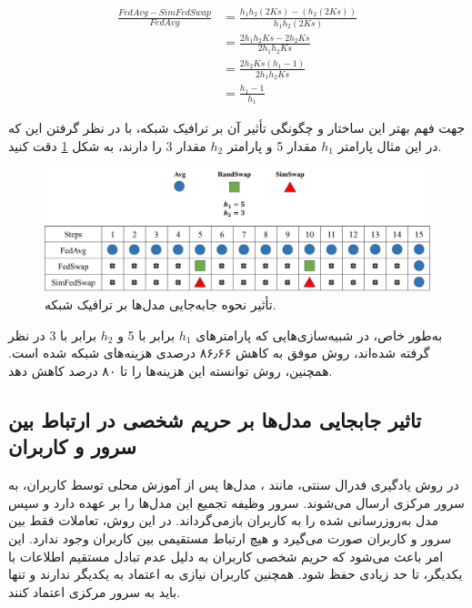 \begingroup
\addtolength{\jot}{0.5em}
\begin{equation}
	\begin{aligned} 
		\frac{FedAvg-SimFedSwap}{FedAvg}
		&= \frac{h_1h_2(2Ks)-(h_2(2Ks))}{h_1h_2(2Ks)} \\
		&= \frac{2h_1h_2Ks-2h_2Ks}{2h_1h_2Ks} \\
		&= \frac{2h_2Ks(h_1 -1)}{2h_1h_2Ks} \\
		&= \frac{h_1 -1}{h_1}
	\end{aligned}
\end{equation}
\endgroup


جهت فهم بهتر این ساختار و چگونگی تأثیر آن بر ترافیک شبکه، با در نظر گرفتن این که در این مثال پارامتر \(h_1\) مقدار 5 و پارامتر \(h_2\) مقدار 3 را دارند، به شکل
\ref{compare_swap_net_traffic} 
دقت کنید.
\begin{figure}[b!]
	\centering
	\includegraphics[scale=0.3]{images/chap4/compare_swap_net_traffic.png}%
	\caption{%
		تأثیر نحوه جابه‌جایی مدل‌ها بر ترافیک شبکه.
	}
	\label{compare_swap_net_traffic}
	\centering
\end{figure}
به‌طور خاص، در شبیه‌سازی‌هایی که پارامترهای \(h_1\) برابر با 5 و \(h_2\) برابر با 3 در نظر گرفته شده‌اند، روش  موفق به کاهش
۸۶٫۶۶
درصدی هزینه‌های شبکه شده است. همچنین، روش  توانسته این هزینه‌ها را تا ۸۰ درصد کاهش دهد. 


\subsection{
تاثیر جابجایی مدل‌ها بر حریم شخصی در ارتباط بین سرور و کاربران
}
در روش یادگیری فدرال سنتی، مانند
%
، مدل‌ها پس از آموزش محلی توسط کاربران، به سرور مرکزی ارسال می‌شوند. سرور وظیفه تجمیع این مدل‌ها را بر عهده دارد و سپس مدل به‌روزرسانی‌ شده را به کاربران بازمی‌گرداند. در این روش، تعاملات فقط بین سرور و کاربران صورت می‌گیرد و هیچ ارتباط مستقیمی بین کاربران وجود ندارد. این امر باعث می‌شود که حریم شخصی کاربران به دلیل عدم تبادل مستقیم اطلاعات با یکدیگر، تا حد زیادی حفظ شود. همچنین کاربران نیازی به اعتماد به یکدیگر ندارند و تنها باید به سرور مرکزی اعتماد کنند.

